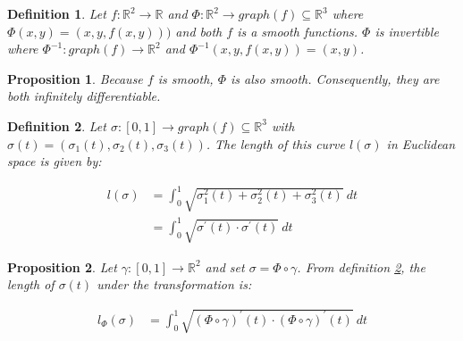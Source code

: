 \documentclass[12pt]{article}
\newtheorem{proposition}{Proposition}
\newtheorem{definition}{Definition}
\begin{document}
	\begin{definition}
		\label{definition:f_and_phi}
		Let $f: \mathbb{R}^2 \rightarrow \mathbb{R}$ and $\Phi: \mathbb{R}^2 \rightarrow graph(f) \subseteq \mathbb{R}^3$ where $\Phi(x, y) = (x, y, f(x, y)))$ and both $f$ is a smooth functions. $\Phi$ is invertible where $\Phi^{-1}: graph(f) \rightarrow \mathbb{R}^2$ and $\Phi^{-1}(x, y, f(x, y)) = (x, y)$.
	\end{definition}
	
	\begin{proposition}
		\label{proposition:f_and_phi_smooth_inf_diff}
		Because $f$ is smooth, $\Phi$ is also smooth. Consequently, they are both infinitely differentiable.
	\end{proposition}
	
	
	\begin{definition}
		\label{definition:length_euclidean}
		Let $\sigma: [0, 1] \rightarrow graph(f) \subseteq \mathbb{R}^3$ with $\sigma(t) = (\sigma_1(t), \sigma_2(t), \sigma_3(t))$. The length of this curve $l(\sigma)$ in Euclidean space is given by:
		
		\begin{align}
			l(\sigma) &= \int_{0}^{1} \sqrt{\sigma_1^2(t) + \sigma_2^2(t) + \sigma_3^2(t)} ~ dt\\
			&= \int_{0}^{1} \sqrt{\sigma^{\prime}(t) \cdot \sigma^{\prime}(t) } ~ dt 
			\label{length_euclidean}
		\end{align}
	\end{definition}
	
	\begin{proposition}
		\label{proposition:length_non_euclidean}
		Let $\gamma: [0, 1] \rightarrow \mathbb{R}^2$ and set $\sigma = \Phi \circ \gamma$. From  definition \ref{definition:length_euclidean}, the length of $\sigma(t)$ under the transformation is:
		
		\begin{align}
			\label{equation:length_non_euclidean}
			l_{\Phi}(\sigma) &= \int_{0}^{1} \sqrt{(\Phi \circ \gamma)^{\prime}(t) \cdot (\Phi \circ \gamma)^{\prime}(t)} ~ dt
		\end{align}
	\end{proposition}
	
\end{document}

